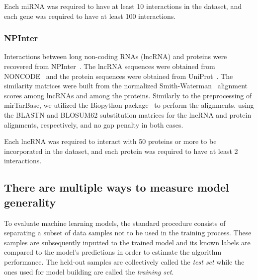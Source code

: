 Each miRNA was required to have at least 10 interactions in the dataset, and each gene was required to have at least 100 interactions.


\subsubsection{NPInter}

Interactions between long non-coding RNAs (lncRNA) and proteins were recovered from NPInter~\cite{wu2006npinter, teng2020npinter}. The lncRNA sequences were obtained from NONCODE~\cite{liu2005noncode,zhao2016noncode} and the protein sequences were obtained from UniProt~\cite{consortium2019uniprot}. The similarity matrices were built from the normalized Smith-Waterman~\cite{yamanishi2008prediction} alignment scores among lncRNAs and among the proteins. Similarly to the preprocessing of mirTarBase, we utilized the Biopython package~\cite{cock2009biopython} to perform the alignments. using the BLASTN and BLOSUM62 substitution matrices for the lncRNA and protein alignments, respectively, and no gap penalty in both cases.

Each lncRNA was required to interact with 50 proteins or more to be incorporated in the dataset, and each protein was required to have at least 2 interactions.



\subsection{There are multiple ways to measure model generality}
\label{sec:bipartite test sets}


To evaluate machine learning models, the standard procedure consists of separating a subset of data samples not to be used in the training process. These samples are subsequently inputted to the trained model and its known labels are compared to the model's predictions in order to estimate the algorithm performance. The held-out samples are collectively called the \emph{test set} while the ones used for model building are called the \emph{training set}.

